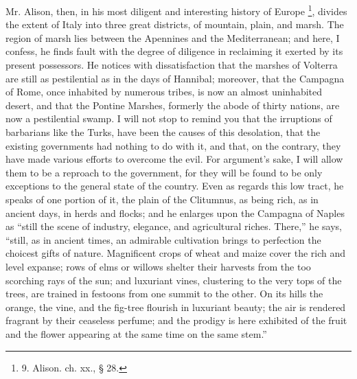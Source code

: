 Mr. Alison, then, in his most
diligent and interesting history of Europe \footnote{9.
Alison. ch. xx., § 28.}, divides the extent of Italy into three great districts, of
mountain, plain, and marsh. The region of marsh lies between the
Apennines and the Mediterranean; and here, I confess, he finds fault
with the degree of diligence in reclaiming it exerted by its present
possessors. He notices with dissatisfaction that the marshes of
Volterra are still as pestilential as in the days of Hannibal;
moreover, that the Campagna of Rome, once inhabited by numerous
tribes, is now an almost uninhabited desert, and that the Pontine
Marshes, formerly the abode of thirty nations, are now a pestilential
swamp. I will not stop to remind you that the irruptions of barbarians
like the Turks, have been the causes of this desolation, that the
existing governments had nothing to do with it, and that, on the
contrary, they have made various efforts to overcome the evil. For
argument's sake, I will allow them to be a reproach to the government,
for they will be found to be only exceptions to the general state of
the country. Even as regards this low tract, he speaks of one portion
of it, the plain of the Clitumnus, as being rich, as in ancient days,
in herds and flocks; and he enlarges upon the Campagna of Naples as ``still
the scene of industry, elegance, and agricultural riches. There,'' he
says, ``still, as in ancient times, an admirable cultivation brings to
perfection the choicest gifts of nature. Magnificent crops of
wheat and maize cover the rich and level expanse; rows of elms or
willows shelter their harvests from the too scorching rays of the sun;
and luxuriant vines, clustering to the very tops of the trees, are
trained in festoons from one summit to the other. On its hills the
orange, the vine, and the fig-tree flourish in luxuriant beauty; the
air is rendered fragrant by their ceaseless perfume; and the prodigy
is here exhibited of the fruit and the flower appearing at the same
time on the same stem.''

